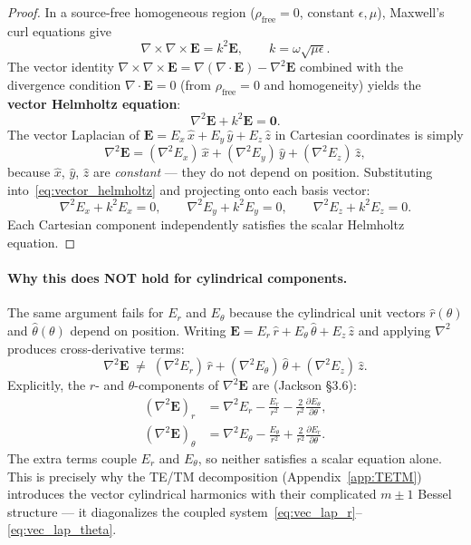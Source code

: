 \documentclass[11pt,a4paper]{article}
\newcommand{\rhat}{\hat{r}}
\newcommand{\that}{\hat{\theta}}
\newcommand{\zhat}{\hat{z}}
\newcommand{\xhat}{\hat{x}}
\newcommand{\yhat}{\hat{y}}
\newcommand{\E}{\mathbf{E}}
\begin{document}
\begin{proof}
In a source-free homogeneous region ($\rho_{\mathrm{free}}=0$, constant $\epsilon,\mu$),
Maxwell's curl equations give
\begin{equation}\label{eq:maxwell_curl}
  \nabla\times\nabla\times\E = k^2\E, \qquad k = \omega\sqrt{\mu\epsilon}.
\end{equation}
The vector identity $\nabla\times\nabla\times\E = \nabla(\nabla\cdot\E) - \nabla^2\E$
combined with the divergence condition $\nabla\cdot\E = 0$ (from $\rho_{\mathrm{free}}=0$
and homogeneity) yields the \textbf{vector Helmholtz equation}:
\begin{equation}\label{eq:vector_helmholtz}
  \nabla^2\E + k^2\E = \mathbf{0}.
\end{equation}
The vector Laplacian of $\E = E_x\,\xhat + E_y\,\yhat + E_z\,\zhat$ in Cartesian
coordinates is simply
\begin{equation}
  \nabla^2\E = (\nabla^2 E_x)\,\xhat + (\nabla^2 E_y)\,\yhat + (\nabla^2 E_z)\,\zhat,
\end{equation}
because $\xhat$, $\yhat$, $\zhat$ are \emph{constant} --- they do not depend on
position.  Substituting into~\eqref{eq:vector_helmholtz} and projecting onto each
basis vector:
\begin{equation}\label{eq:scalar_helmholtz_components}
  \nabla^2 E_x + k^2 E_x = 0, \qquad
  \nabla^2 E_y + k^2 E_y = 0, \qquad
  \nabla^2 E_z + k^2 E_z = 0.
\end{equation}
Each Cartesian component independently satisfies the scalar Helmholtz equation.
\end{proof}

\paragraph{Why this does NOT hold for cylindrical components.}
The same argument fails for $E_r$ and $E_\theta$ because the cylindrical unit vectors
$\rhat(\theta)$ and $\that(\theta)$ depend on position.  Writing
$\E = E_r\,\rhat + E_\theta\,\that + E_z\,\zhat$ and applying $\nabla^2$
produces cross-derivative terms:
\begin{equation}
  \nabla^2\E \;\ne\; (\nabla^2 E_r)\,\rhat + (\nabla^2 E_\theta)\,\that + (\nabla^2 E_z)\,\zhat.
\end{equation}
Explicitly, the $r$- and $\theta$-components of $\nabla^2\E$ are (Jackson \S3.6):
\begin{align}
  (\nabla^2\E)_r &= \nabla^2 E_r - \frac{E_r}{r^2} - \frac{2}{r^2}\frac{\partial E_\theta}{\partial\theta},
  \label{eq:vec_lap_r}\\[4pt]
  (\nabla^2\E)_\theta &= \nabla^2 E_\theta - \frac{E_\theta}{r^2} + \frac{2}{r^2}\frac{\partial E_r}{\partial\theta}.
  \label{eq:vec_lap_theta}
\end{align}
The extra terms couple $E_r$ and $E_\theta$, so neither satisfies a scalar equation
alone.  This is precisely why the TE/TM decomposition (Appendix~\ref{app:TETM})
introduces the vector cylindrical harmonics with their complicated $m\pm 1$ Bessel
structure --- it diagonalizes the coupled system~\eqref{eq:vec_lap_r}--\eqref{eq:vec_lap_theta}.
\end{document}
